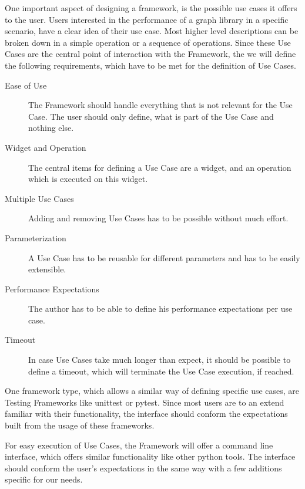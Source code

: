 \label{sec:application:analysis:usecase}

One important aspect of designing a framework, is the possible use cases it
offers to the user. Users interested in the performance of a graph library in a
specific scenario, have a clear idea of their use case. Most higher level
descriptions can be broken down in a simple operation or a sequence of
operations. Since these Use Cases are the central point of interaction with the
Framework, the we will define the following requirements, which have to be met
for the definition of Use Cases.

\begin{description}
    \item[Ease of Use] 
        The Framework should handle everything that is not relevant for the Use
        Case. The user should only define, what is part of the Use Case and
        nothing else.
    \item[Widget and Operation]
        The central items for defining a Use Case are a widget, and an operation
        which is executed on this widget.
    \item[Multiple Use Cases]
        Adding and removing Use Cases has to be possible without much effort.
    \item[Parameterization]
        A Use Case has to be reusable for different parameters and has to be
        easily extensible.
    \item[Performance Expectations]
        The author has to be able to define his performance expectations per use
        case.
    \item[Timeout]
        In case Use Cases take much longer than expect, it should be possible
        to define a timeout, which will terminate the Use Case execution, if
        reached.
\end{description}

One framework type, which allows a similar way of defining specific use cases,
are Testing Frameworks like unittest or pytest. Since most users are to an
extend familiar with their functionality, the interface should conform the
expectations built from the usage of these frameworks.

For easy execution of Use Cases, the Framework will offer a command line
interface, which offers similar functionality like other python tools. The
interface should conform the user's expectations in the same way with a few
additions specific for our needs. 

